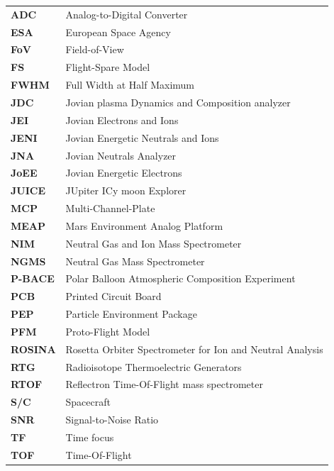 \documentclass[a4paper, 12pt, abstracton]{scrartcl}
\begin{document}
	\begin{tabular}{>{\bfseries}l|l}
		
		ADC		& Analog-to-Digital Converter \\
		ESA		& European Space Agency \\
		FoV		& Field-of-View\\
		FS		& Flight-Spare Model\\
		FWHM  	& Full Width at Half Maximum \\ 
		JDC		& Jovian plasma Dynamics and Composition analyzer \\
		JEI		& Jovian Electrons and Ions\\
		JENI	& Jovian Energetic Neutrals and Ions\\
		JNA		& Jovian Neutrals Analyzer \\
		JoEE	& Jovian Energetic Electrons \\
		JUICE 	& JUpiter ICy moon Explorer \\ 
		MCP		& Multi-Channel-Plate \\
		MEAP	& Mars Environment Analog Platform \\
		NIM	  	& Neutral Gas and Ion Mass Spectrometer \\
		NGMS	& Neutral Gas Mass Spectrometer \\
		P-BACE	& Polar Balloon Atmospheric Composition Experiment \\
		PCB		& Printed Circuit Board \\
		PEP   	& Particle Environment Package \\
		PFM		& Proto-Flight Model \\
		ROSINA	& Rosetta Orbiter Spectrometer for Ion and Neutral Analysis\\
		RTG		& Radioisotope Thermoelectric Generators\\
		RTOF	& Reflectron Time-Of-Flight mass spectrometer\\
		S/C		& Spacecraft\\
		SNR		& Signal-to-Noise Ratio \\
		TF		& Time focus \\
		TOF		& Time-Of-Flight \\

	\end{tabular}
	\newpage
	\thispagestyle{empty}
	\null
	\newpage
	

	
	\newpage
	\thispagestyle{empty}
	\null
	\newpage
	
	\newpage
	
	\clearpage
	\newpage
	\thispagestyle{empty}
	\null
	\newpage
	
	\clearpage
	
	\newpage
	\thispagestyle{empty}
	\null
	\newpage
	
	\clearpage
	
	\clearpage
	
	\clearpage
	
\end{document}
